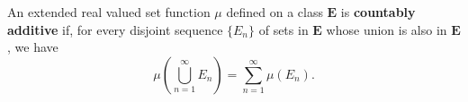 An extended real valued set function $\mu$ defined on a class $\mathbf{E}$ is \textbf{countably additive} if, for every disjoint sequence $\{E_n\}$ of sets in $\mathbf{E}$ whose union is also in $\mathbf{E}$, we have
$$\mu\left(\bigcup_{n=1}^{\infty} E_n\right) = \sum_{n=1}^{\infty} \mu(E_n).$$

